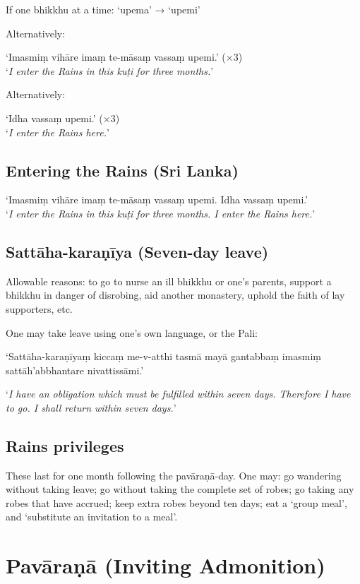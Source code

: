 If one bhikkhu at a time: ‘upema’ → ‘upemi’

Alternatively:

‘Imasmiṃ vihāre imaṃ te-māsaṃ vassaṃ upemi.’ (×3)\\
‘\emph{I enter the Rains in this kuṭi for three months.}’

Alternatively:

‘Idha vassaṃ upemi.’ (×3)\\
‘\emph{I enter the Rains here.}’ 

\subsection{Entering the Rains (Sri Lanka)}

‘Imasmiṃ vihāre imaṃ te-māsaṃ vassaṃ upemi. Idha vassaṃ upemi.’\\
‘\emph{I enter the Rains in this kuṭi for three months. I enter the Rains
  here.}’

\subsection{Sattāha-karaṇīya (Seven-day leave)}

Allowable reasons: to go to nurse an ill bhikkhu or one's parents, support a
bhikkhu in danger of disrobing, aid another monastery, uphold the faith of lay
supporters, etc.

One may take leave using one's own language, or the Pali:

‘Sattāha-karaṇīyaṃ kiccaṃ me-v-atthi tasmā mayā gantabbaṃ imasmiṃ
sattāh'abbhantare nivattissāmi.’

‘\emph{I have an obligation which must be fulfilled within seven days. Therefore
  I have to go. I shall return within seven days.}’\\
\mbox{}

\subsection{Rains privileges}

These last for one month following the pavāraṇā-day. One may: go wandering
without taking leave; go without taking the complete set of robes; go taking any
robes that have accrued; keep extra robes beyond ten days; eat a ‘group meal’,
and ‘substitute an invitation to a meal’.

\section{Pavāraṇā (Inviting Admonition)}


